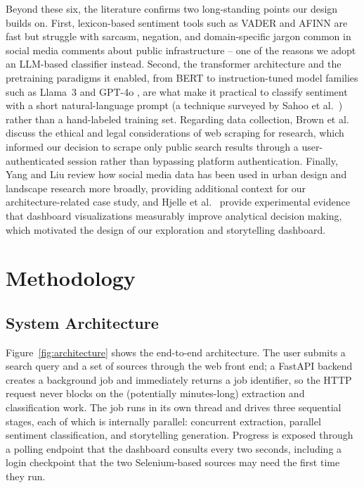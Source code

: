 \documentclass[runningheads]{llncs}
\begin{document}
Beyond these six, the literature confirms two long-standing points our design
builds on. First, lexicon-based sentiment tools such as VADER
\cite{hutto2014vader} and AFINN \cite{nielsen2011afinn} are fast but
struggle with sarcasm, negation, and domain-specific jargon common in social
media comments about public infrastructure -- one of the reasons we adopt an
LLM-based classifier instead. Second, the transformer architecture
\cite{vaswani2017attention} and the pretraining paradigms it enabled, from
BERT \cite{devlin2019bert} to instruction-tuned model families such as
Llama~3 \cite{grattafiori2024llama3} and GPT-4o \cite{openai2024gpt4o}, are
what make it practical to classify sentiment with a short natural-language
prompt (a technique surveyed by Sahoo et al.\ \cite{sahoo2024promptsurvey})
rather than a hand-labeled training set. Regarding data collection, Brown et
al.\ \cite{brown2024webscraping} discuss the ethical and legal
considerations of web scraping for research, which informed our decision to
scrape only public search results through a user-authenticated session
rather than bypassing platform authentication. Finally, Yang and Liu
\cite{yang2022socialmedia} review how social media data has been used in
urban design and landscape research more broadly, providing additional
context for our architecture-related case study, and Hjelle et al.\
\cite{hjelle2024dashboard} provide experimental evidence that dashboard
visualizations measurably improve analytical decision making, which
motivated the design of our exploration and storytelling dashboard.

\section{Methodology}
\label{sec:methodology}

\subsection{System Architecture}

Figure~\ref{fig:architecture} shows the end-to-end architecture. The user
submits a search query and a set of sources through the web front end; a
FastAPI backend creates a background job and immediately returns a job
identifier, so the HTTP request never blocks on the (potentially
minutes-long) extraction and classification work. The job runs in its own
thread and drives three sequential stages, each of which is internally
parallel: concurrent extraction, parallel sentiment classification, and
storytelling generation. Progress is exposed through a polling endpoint that
the dashboard consults every two seconds, including a login checkpoint that
the two Selenium-based sources may need the first time they run.
\end{document}
